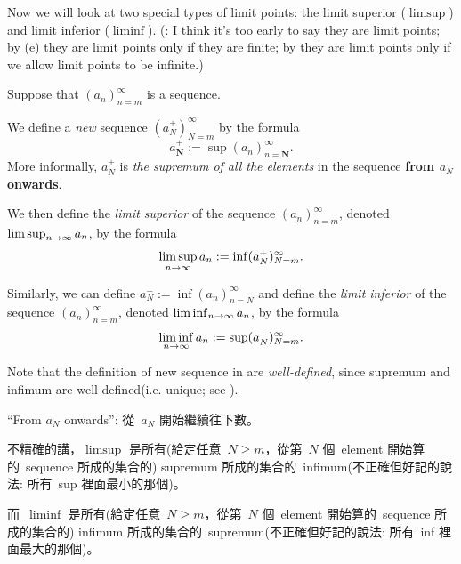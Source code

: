 Now we will look at two special types of limit points: the limit superior (\(\limsup\)) and limit inferior (\(\liminf\)).
(: I think it's too early to say they are limit points;
by (e) they are limit points only if they are finite;
by  they are limit points only if we allow limit points to be infinite.)

\begin{definition}   \label{def 6.4.6}
Suppose that \((a_n)_{n = m}^{\infty}\) is a sequence.

  We define a \emph{new} sequence \((a_N^+)_{N = m}^{\infty}\) by the formula
\[
    a_{\textbf{N}}^+ := \sup(a_n)_{n = \textbf{N}}^{\infty}.
\]
More informally, \(a_N^+\) is \emph{the supremum of all the elements} in the sequence \textbf{from \(a_N\) onwards}.

 We then define the \emph{limit superior} of the sequence \((a_n)_{n = m}^{\infty}\), denoted \(\limsup_{n \to \infty} a_n\), by the formula
\[
    \limsup_{n \to \infty} a_n := \inf(a_N^+)_{N = m}^{\infty}.
\]

 Similarly, we can define \(a_N^- := \inf(a_n)_{n = N}^{\infty}\) and  define the \emph{limit inferior} of the sequence \((a_n)_{n = m}^{\infty}\), denoted \(\liminf_{n \to \infty} a_n\), by the formula
\[
    \liminf_{n \to \infty} a_n := \sup(a_N^-)_{N = m}^{\infty}.
\]

Note that the definition of new sequence in  are \emph{well-defined}, since supremum and infimum are well-defined(i.e. unique; see ).
\end{definition}

\begin{note}
``From \(a_N\) onwards'': 從\ \(a_N\) 開始繼續往下數。

不精確的講，\(\limsup\) 是所有(給定任意\ \(N \ge m\)，從第\ \(N\) 個\ element 開始算的\ sequence 所成的集合的) supremum 所成的集合的\ infimum(不正確但好記的說法: 所有\ sup 裡面最小的那個)。

而\ \(\liminf\) 是所有(給定任意\ \(N \ge m\)，從第\ \(N\) 個\ element 開始算的\ sequence 所成的集合的) infimum 所成的集合的\ supremum(不正確但好記的說法: 所有\ inf 裡面最大的那個)。
\end{note}

